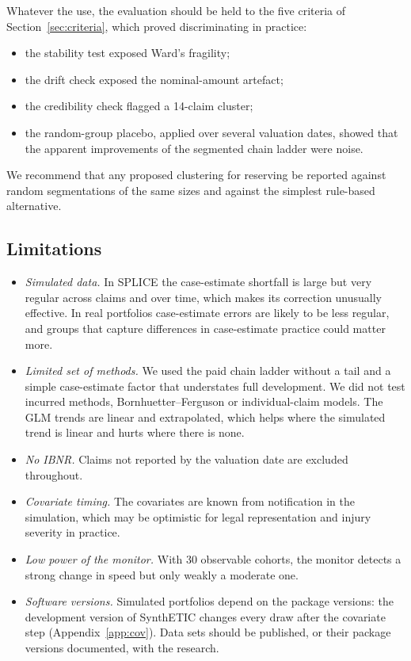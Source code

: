 Whatever the use, the evaluation should be held to the five criteria of Section~\ref{sec:criteria}, which proved discriminating in practice:
\begin{itemize}[leftmargin=*]
\item the stability test exposed Ward's fragility;
\item the drift check exposed the nominal-amount artefact;
\item the credibility check flagged a 14-claim cluster;
\item the random-group placebo, applied over several valuation dates, showed that the apparent improvements of the segmented chain ladder were noise.
\end{itemize}
We recommend that any proposed clustering for reserving be reported against random segmentations of the same sizes and against the simplest rule-based alternative.

\subsection{Limitations}

\begin{itemize}[leftmargin=*]
\item \emph{Simulated data.} In SPLICE the case-estimate shortfall is large but very regular across claims and over time, which makes its correction unusually effective. In real portfolios case-estimate errors are likely to be less regular, and groups that capture differences in case-estimate practice could matter more.
\item \emph{Limited set of methods.} We used the paid chain ladder without a tail and a simple case-estimate factor that understates full development. We did not test incurred methods, Bornhuetter--Ferguson or individual-claim models. The GLM trends are linear and extrapolated, which helps where the simulated trend is linear and hurts where there is none.
\item \emph{No IBNR.} Claims not reported by the valuation date are excluded throughout.
\item \emph{Covariate timing.} The covariates are known from notification in the simulation, which may be optimistic for legal representation and injury severity in practice.
\item \emph{Low power of the monitor.} With 30 observable cohorts, the monitor detects a strong change in speed but only weakly a moderate one.
\item \emph{Software versions.} Simulated portfolios depend on the package versions: the development version of SynthETIC changes every draw after the covariate step (Appendix~\ref{app:cov}). Data sets should be published, or their package versions documented, with the research.
\end{itemize}

